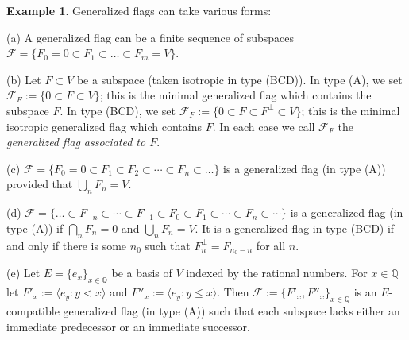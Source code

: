 \documentclass[12pt]{amsart}
\newcommand{\Ff}{\mathcal{F}}
\newcommand{\os}{\Sigma}
\renewcommand{\span}[1]{\langle #1\rangle}
\numberwithin{equation}{section}
\theoremstyle{definition}
\newtheorem{example}[theorem]{Example}
\begin{document}
\begin{example}
\label{E1}
Generalized flags can take various forms:

{\rm (a)} A generalized flag can be a finite sequence of subspaces $\Ff=\{F_0=0\subset F_1\subset\ldots\subset F_m=V\}$.


{\rm (b)} Let $F\subset V$ be a subspace (taken isotropic in type (BCD)). In type (A), we set $\Ff_F:=\{0\subset F\subset V\}$; this is the minimal generalized flag which contains the subspace $F$. In type (BCD), we set $\Ff_F:=\{0\subset F\subset F^\perp\subset V\}$; this is the minimal isotropic generalized flag which contains $F$. In each case we call $\Ff_F$ the {\em generalized flag associated to $F$}.

{\rm (c)}
$\Ff=\{F_0=0\subset F_1\subset F_2\subset\cdots\subset F_n\subset\ldots\}$ is a generalized flag 
(in type (A))
provided that $\bigcup_{n}F_n=V$.

{\rm (d)}
$\Ff=\{\ldots \subset F_{-n}\subset \cdots\subset F_{-1}\subset F_0\subset F_1\subset\cdots\subset F_n\subset\cdots \}$ is a generalized flag (in type (A)) if $\bigcap_{n}F_n=0$ and $\bigcup_{n}F_n=V$.
It is a generalized flag in type (BCD) if and only if there is some $n_0$ such that $F_n^\perp=F_{n_0-n}$ for all $n$.

{\rm (e)}
Let $E=\{e_x\}_{x\in\mathbb{Q}}$ be a basis of $V$ indexed by the rational numbers. For $x\in\mathbb{Q}$ let $F'_x:=\span{e_y:y<x}$ and $F''_x:=\span{e_y:y\leq x}$. Then $\Ff:=\{F'_x,F''_x\}_{x\in\mathbb{Q}}$ is an $E$-compatible generalized flag (in type (A)) such that each subspace lacks either an immediate predecessor or an immediate successor.

\end{example}
\end{document}
